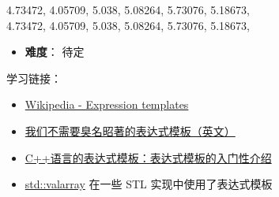 \begin{tcolorbox}[title = {运行结果},
    fonttitle = \bfseries, fontupper = \sffamily, fontlower = \itshape]
    4.73472, 4.05709, 5.038, 5.08264, 5.73076, 5.18673,\\
    4.73472, 4.05709, 5.038, 5.08264, 5.73076, 5.18673,
\end{tcolorbox}

\begin{itemize}
    \item \textbf{难度}： 待定
\end{itemize}

学习链接：
\begin{itemize}
    \item \href{https://en.wikipedia.org/wiki/Expression_templates}{Wikipedia - Expression templates}
    \item \href{https://gieseanw.wordpress.com/2019/10/20/we-dont-need-no-stinking-expression-templates/}{我们不需要臭名昭著的表达式模板（英文）}
    \item \href{https://blog.csdn.net/magisu/article/details/12964911}{C++语言的表达式模板：表达式模板的入门性介绍}
    \item \href{https://zh.cppreference.com/w/cpp/numeric/valarray}{std::valarray} 在一些 STL 实现中使用了表达式模板
\end{itemize}
